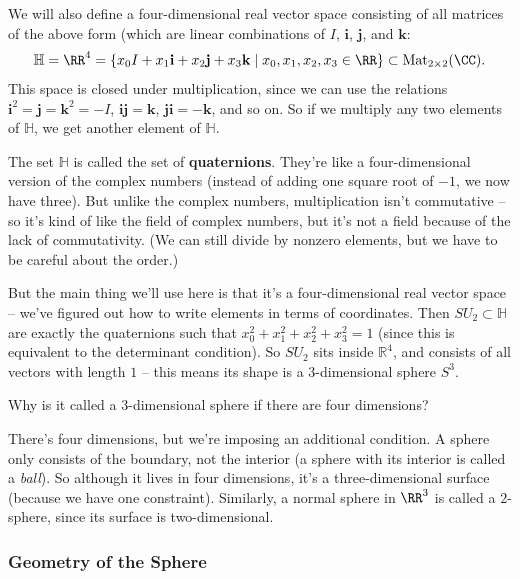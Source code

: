 We will also define a four-dimensional real vector space consisting of all matrices of the above form (which are linear combinations of $I$, $\mathbf{i}$, $\mathbf{j}$, and $\mathbf{k}$:
\[\mathbb{H} = \RR^4 = \{x_0 I + x_1 \mathbf{i} +x_2 \mathbf{j} + x_3 \mathbf{k} \mid x_0, x_1, x_2, x_3 \in \RR\} \subset \operatorname{Mat}_{2\times 2} (\CC).\] 
This space is closed under multiplication, since we can use the relations $\mathbf{i}^2 = \mathbf{j} = \mathbf{k}^2 = -I$, $\mathbf{i} \mathbf{j} = \mathbf{k}$, $\mathbf{j} \mathbf{i} = - \mathbf{k}$, and so on. So if we multiply any two elements of $\mathbb{H}$, we get another element of $\mathbb{H}$. 

The set $\mathbb{H}$ is called the set of \textbf{quaternions}. They're like a four-dimensional version of the complex numbers (instead of adding one square root of $-1$, we now have three). But unlike the complex numbers, multiplication isn't commutative -- so it's kind of like the field of complex numbers, but it's not a field because of the lack of commutativity. (We can still divide by nonzero elements, but we have to be careful about the order.)

But the main thing we'll use here is that it's a four-dimensional real vector space -- we've figured out how to write elements in terms of coordinates. Then $SU_2 \subset \mathbb{H}$ are exactly the quaternions such that $x_0^2 + x_1^2 + x_2^2 + x_3^2 = 1$ (since this is equivalent to the determinant condition). So $SU_2$ sits inside $\mathbb{R}^4$, and consists of all vectors with length $1$ -- this means its shape is a $3$-dimensional sphere $S^3$. 

\begin{question}
    Why is it called a 3-dimensional sphere if there are four dimensions?
\end{question}

\begin{ans}
    There's four dimensions, but we're imposing an additional condition. A sphere only consists of the boundary, not the interior (a sphere with its interior is called a \emph{ball}). So although it lives in four dimensions, it's a three-dimensional surface (because we have one constraint). Similarly, a normal sphere in $\RR^3$ is called a $2$-sphere, since its surface is two-dimensional. 
\end{ans}

\subsubsection{Geometry of the Sphere}

